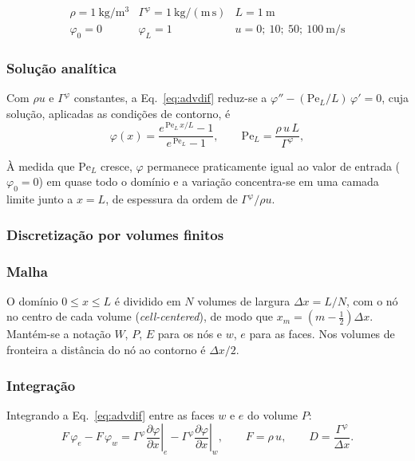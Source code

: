 \[
\begin{array}{lll}
  \rho=1\ \mathrm{kg/m^{3}} & \Gamma^{\varphi}=1\ \mathrm{kg/(m\,s)} & L=1\ \mathrm{m}\\[2pt]
  \varphi_0=0 & \varphi_L=1 & u=0;\ 10;\ 50;\ 100\ \mathrm{m/s}
\end{array}
\]

\subsubsection*{Solução analítica}

Com $\rho u$ e $\Gamma^{\varphi}$ constantes, a Eq.~\eqref{eq:advdif} reduz-se a
$\varphi''-(\mathrm{Pe}_L/L)\,\varphi'=0$, cuja solução, aplicadas as condições
de contorno, é
\begin{equation}
  \varphi(x)=\frac{e^{\,\mathrm{Pe}_L\,x/L}-1}{e^{\,\mathrm{Pe}_L}-1},
  \qquad
  \mathrm{Pe}_L=\frac{\rho\,u\,L}{\Gamma^{\varphi}} ,
  \label{eq:analitica}
\end{equation}

À medida que $\mathrm{Pe}_L$ cresce, $\varphi$ permanece praticamente igual ao
valor de entrada ($\varphi_0=0$) em quase todo o domínio e a variação
concentra-se em uma camada limite junto a $x=L$, de espessura da ordem de
$\Gamma^{\varphi}/\rho u$.

\subsubsection*{Discretização por volumes finitos}

\subsubsection*{Malha}

O domínio $0\le x\le L$ é dividido em $N$ volumes de largura $\Delta x=L/N$,
com o nó no centro de cada volume (\emph{cell-centered}), de modo que
$x_m=(m-\tfrac12)\Delta x$. Mantém-se a notação $W$, $P$, $E$ para os nós e
$w$, $e$ para as faces. Nos volumes de fronteira a distância do nó ao contorno
é $\Delta x/2$.

\subsubsection*{Integração}

Integrando a Eq.~\eqref{eq:advdif} entre as faces $w$ e $e$ do volume $P$:
\begin{equation}
  F\,\varphi_e-F\,\varphi_w
  =\Gamma^{\varphi}\left.\frac{\partial\varphi}{\partial x}\right|_e
  -\Gamma^{\varphi}\left.\frac{\partial\varphi}{\partial x}\right|_w ,
  \qquad
  F=\rho\,u,\qquad D=\frac{\Gamma^{\varphi}}{\Delta x} .
  \label{eq:balanco}
\end{equation}

